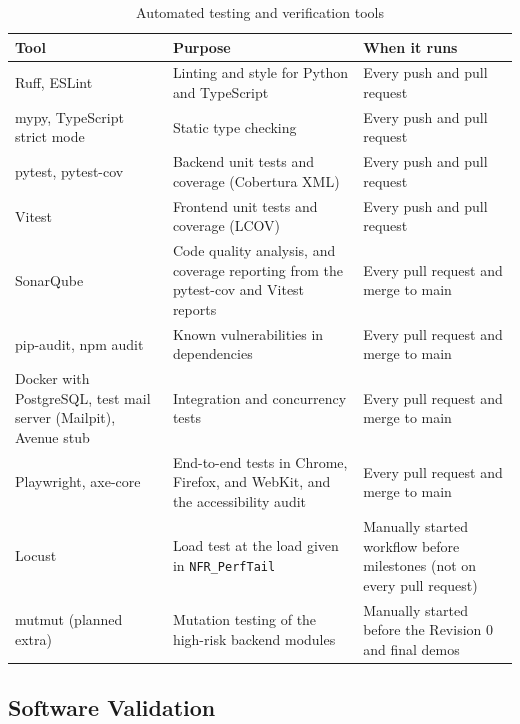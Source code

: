 \documentclass[12pt, titlepage]{article}
\begin{document}
  \begin{table}[h!]
    \centering
    \renewcommand{\arraystretch}{1.2}
    \begin{tabularx}{\textwidth}{>{\raggedright\arraybackslash}p{3.3cm} >{\raggedright\arraybackslash}p{4.7cm} X}
      \toprule
      \textbf{Tool} & \textbf{Purpose} & \textbf{When it runs}\\
      \midrule
      Ruff, ESLint & Linting and style for Python and TypeScript & Every push and pull request\\
      \addlinespace
      mypy, TypeScript strict mode & Static type checking & Every push and pull request\\
      \addlinespace
      pytest, pytest-cov & Backend unit tests and coverage (Cobertura XML) & Every push and pull request\\
      \addlinespace
      Vitest & Frontend unit tests and coverage (LCOV) & Every push and pull request\\
      \addlinespace
      SonarQube & Code quality analysis, and coverage reporting from the pytest-cov and Vitest reports & Every pull request and merge to main\\
      \addlinespace
      pip-audit, npm audit & Known vulnerabilities in dependencies & Every pull request and merge to main\\
      \addlinespace
      Docker with PostgreSQL, test mail server (Mailpit), Avenue stub & Integration and concurrency tests & Every pull request and merge to main\\
      \addlinespace
      Playwright, axe-core & End-to-end tests in Chrome, Firefox, and WebKit, and the accessibility audit & Every pull request and merge to main\\
      \addlinespace
      Locust & Load test at the load given in \texttt{NFR\_PerfTail} & Manually started workflow before milestones (not on every pull request)\\
      \addlinespace
      mutmut (planned extra) & Mutation testing of the high-risk backend modules & Manually started before the Revision 0 and final demos\\
      \bottomrule
    \end{tabularx}
    \caption{Automated testing and verification tools}
    \label{tab:tools}
  \end{table}

  \subsection{Software Validation}
  \label{sec:validation}
\end{document}

